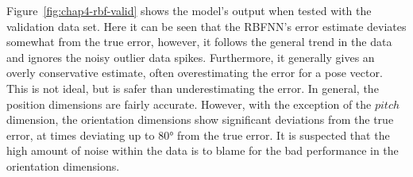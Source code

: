 Figure~\ref{fig:chap4-rbf-valid} shows the model's output when tested with the validation data set. Here it can be seen that the RBFNN's error estimate deviates somewhat from the true error, however, it follows the general trend in the data and ignores the noisy outlier data spikes. Furthermore, it generally gives an overly conservative estimate, often overestimating the error for a pose vector. This is not ideal, but is safer than underestimating the error. In general, the position dimensions are fairly accurate. However, with the exception of the $pitch$ dimension, the orientation dimensions show significant deviations from the true error, at times deviating up to $\ang{80}$ from the true error. It is suspected that the high amount of noise within the data is to blame for the bad performance in the orientation dimensions. 

